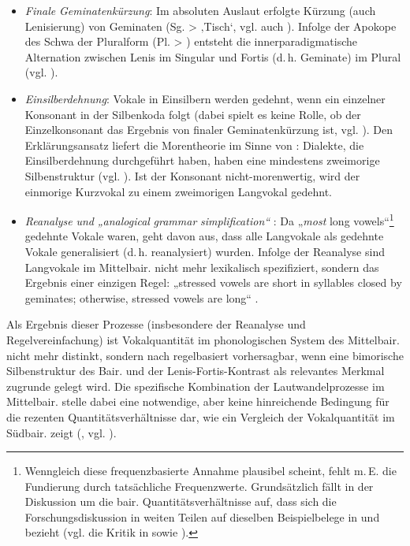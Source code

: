 \begin{itemize}
\item \textit{Finale} \textit{Geminatenkürzung}: Im absoluten Auslaut erfolgte Kürzung (auch Lenisierung) von Geminaten (Sg.  >  ‚Tisch‘, vgl. auch \citealt[20--21]{Lessiak1933}). Infolge der Apokope des Schwa der Pluralform (Pl.  > ) entsteht die innerparadigmatische Alternation zwischen Lenis im Singular und Fortis (d.\,h. Geminate) im Plural (vgl. \citealt[1098]{Wiesinger1983a}).
\item \textit{Einsilberdehnung}: Vokale in Einsilbern werden gedehnt, wenn ein einzelner Konsonant in der Silbenkoda folgt (dabei spielt es keine Rolle, ob der Einzelkonsonant das Ergebnis von finaler Geminatenkürzung ist, vgl. \citealt[259]{Seiler2009}). Den Erklärungsansatz liefert die Morentheorie im Sinne von \citet{Hayes1989}: Dialekte, die Einsilberdehnung durchgeführt haben, haben eine mindestens zweimorige Silbenstruktur (vgl. \citealt[259]{Seiler2009}). Ist der Konsonant nicht-morenwertig, wird der einmorige Kurzvokal zu einem zweimorigen Langvokal gedehnt.
\item \textit{Reanalyse} \textit{und} \textit{„analogical} \textit{grammar} \textit{simplification“} \citep[122]{Seiler2005}: Da „\textit{most} long vowels“\footnote{Wenngleich diese frequenzbasierte Annahme plausibel scheint, fehlt m.\,E. die Fundierung durch tatsächliche Frequenzwerte. Grundsätzlich fällt in der Diskussion um die bair. Quantitätsverhältnisse auf, dass sich die Forschungsdiskussion in weiten Teilen auf dieselben Beispielbelege in \citet{Pfalz1913, Pfalz1936} und \citet{Kufner1957} bezieht (vgl. die Kritik in \citealt[344]{MoosmüllerScheutz2018} sowie \citealt{Seidelmann2013}).} gedehnte Vokale waren, geht \citet[117]{Seiler2005} davon aus, dass alle Langvokale als gedehnte Vokale generalisiert (d.\,h. reanalysiert) wurden. Infolge der Reanalyse sind Langvokale im Mittelbair. nicht mehr lexikalisch spezifiziert, sondern das Ergebnis einer einzigen Regel: „stressed vowels are short in syllables closed by geminates; otherwise, stressed vowels are long“ \citep[118]{Seiler2005}.
\end{itemize}

Als Ergebnis dieser Prozesse (insbesondere der Reanalyse und Regelvereinfachung) ist Vokalquantität im phonologischen System des Mittelbair. nicht mehr distinkt, sondern nach \citet[122]{Seiler2005} regelbasiert vorhersagbar, wenn eine bimorische Silbenstruktur des Bair. und der Lenis-Fortis-Kontrast als relevantes Merkmal zugrunde gelegt wird. Die spezifische Kombination der Lautwandelprozesse im Mittelbair. stelle dabei eine notwendige, aber keine hinreichende Bedingung für die rezenten Quantitätsverhältnisse dar, wie ein Vergleich der Vokalquantität im Südbair. zeigt (\citealt[121--122]{Seiler2005}, vgl. \citealt[§34k und Karte 22]{Kranzmayer1956}).

